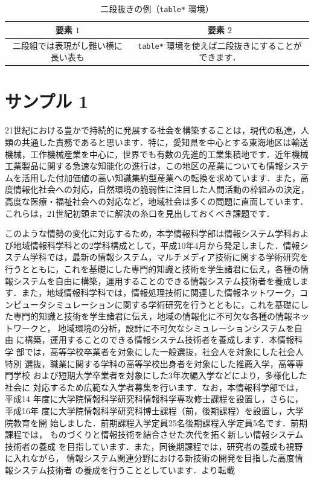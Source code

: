 \documentclass[a4j,9pt,twocolumn,dvipdfmx]{jsarticle}
\begin{document}
\begin{table}
 \caption{二段抜きの例（\texttt{table*} 環境）}
 \label{tab:exp}
 \vspace{-1em}
 \begin{center}
  \begin{tabular}{|c|c|}
   \hline
   要素 $1$&要素 $2$\\
   \hline
   二段組では表現がし難い横に長い表も&\texttt{table*} 環境を使えば二段抜きにすることができます．\\
   \hline
  \end{tabular}
 \end{center}
\end{table}

\section{サンプル 1}
21世紀における豊かで持続的に発展する社会を構築することは，現代の私達，人
類の共通した責務であると思います．特に，愛知県を中心とする東海地区は輸送
機械，工作機械産業を中心に，世界でも有数の先進的工業集積地です．近年機械
工業製品に関する急速な知能化の進行は，この地区の産業についても情報システ
ムを活用した付加価値の高い知識集約型産業への転換を求めています．また，高
度情報化社会への対応，自然環境の脆弱性に注目した人間活動の枠組みの決定，
高度な医療・福祉社会への対応など，地域社会は多くの問題に直面しています．
これらは，21世紀初頭までに解決の糸口を見出しておくべき課題です．

このような情勢の変化に対応するため，本学情報科学部は情報システム学科およ
び地域情報科学科との2学科構成として，平成10年4月から発足しました．情報シ
ステム学科では，最新の情報システム，マルチメディア技術に関する学術研究を
行うとともに，これを基礎にした専門的知識と技術を学生諸君に伝え，各種の情
報システムを自由に構築，運用することのできる情報システム技術者を養成しま
す．また，地域情報科学科では，情報処理技術に関連した情報ネットワーク，コ
ンピュータシミュレーションに関する学術研究を行うとともに，これを基礎にし
た専門的知識と技術を学生諸君に伝え，地域の情報化に不可欠な各種の情報ネッ
トワークと，
\pagebreak
地域環境の分析，設計に不可欠なシミュレーションシステムを自由
に構築，運用することのできる情報システム技術者を養成します．本情報科学
部では，高等学校卒業者を対象にした一般選抜，社会人を対象にした社会人特別
選抜，職業に関する学科の高等学校出身者を対象にした推薦入学，高等専門学校
および短期大学卒業者を対象にした3年次編入学などにより，多様化した社会に
対応するため広範な入学者募集を行います．なお，本情報科学部では，平成14
年度に大学院情報科学研究科情報科学専攻修士課程を設置し，さらに，平成16年
度に大学院情報科学研究科博士課程（前，後期課程）を設置し，大学院教育を開
始しました．前期課程入学定員25名後期課程入学定員5名です．前期課程では，
ものづくりと情報技術を結合させた次代を拓く新しい情報システム技術者の養成
を目指しています．また，同後期課程では，研究者の養成も視野に入れながら，
情報システム関連分野における新技術の開発を目指した高度情報システム技術者
の養成を行うこととしています．\hfill{\cite{www1}より転載}
\end{document}
